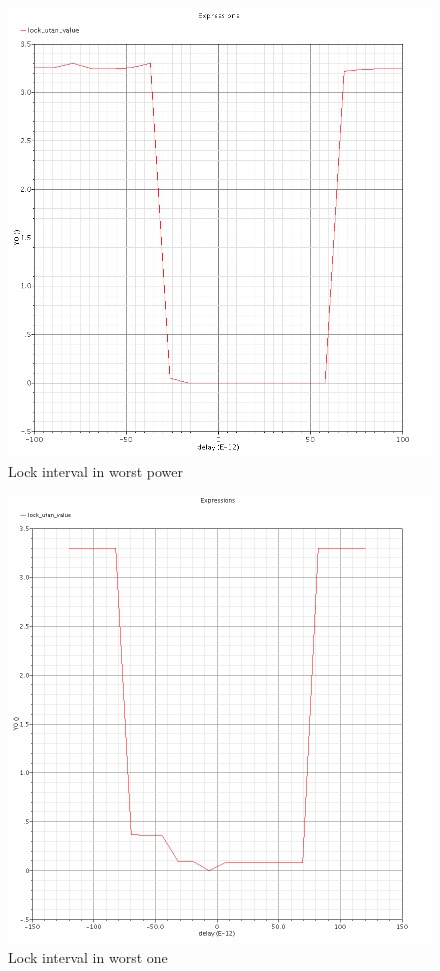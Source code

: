 \documentclass[a4paper,12pt]{article} \usepackage{graphicx}
\begin{document}
\begin{figure}[h]
  \centering
  \includegraphics[width=5in]{../Bilder/LD_tran/LD_lsim_wp.png}
  \caption{Lock interval in worst power}
  \label{fig:LDwp}
\end{figure}

\begin{figure}[h]
  \centering
  \includegraphics[width=5in]{../Bilder/LD_tran/LD_lsim_wo.png}
  \caption{Lock interval in worst one}
  \label{fig:LDwo}
\end{figure}
\end{document}

